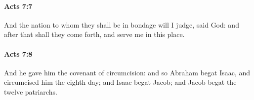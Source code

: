 		\paragraph{Acts 7:7} %
			\label{ACTS-7-7}

			And the nation to whom they shall be in bondage will I judge, said God: and after that shall they come forth, and serve me in this place.

			\begin{framed}
			\scriptsize
				\begin{compactdesc}
					\item[SBLG] 
				\end{compactdesc}
			\end{framed}

		\paragraph{Acts 7:8} %
			\label{ACTS-7-8}

			And he gave him the covenant of circumcision: and so Abraham begat Isaac, and circumcised him the eighth day; and Isaac begat Jacob; and Jacob begat the twelve patriarchs.

